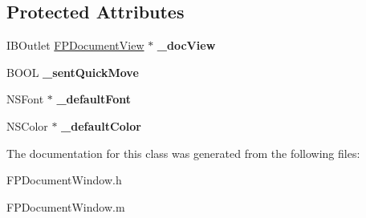 \subsection*{Protected Attributes}
\begin{DoxyCompactItemize}
\item 
\mbox{\label{interface_f_p_document_window_ab31863f6d7c3684efabd2a23bfee628a}} 
I\+B\+Outlet \mbox{\hyperlink{interface_f_p_document_view}{F\+P\+Document\+View}} $\ast$ {\bfseries \+\_\+doc\+View}
\item 
\mbox{\label{interface_f_p_document_window_af7467ded67dd8eb3555455fbf3f78553}} 
B\+O\+OL {\bfseries \+\_\+sent\+Quick\+Move}
\item 
\mbox{\label{interface_f_p_document_window_af44108ef697d5a35426dc283cc702fff}} 
N\+S\+Font $\ast$ {\bfseries \+\_\+default\+Font}
\item 
\mbox{\label{interface_f_p_document_window_a5d4da752e97a9dde5ca0b0402c38bb43}} 
N\+S\+Color $\ast$ {\bfseries \+\_\+default\+Color}
\end{DoxyCompactItemize}


The documentation for this class was generated from the following files\+:\begin{DoxyCompactItemize}
\item 
F\+P\+Document\+Window.\+h\item 
F\+P\+Document\+Window.\+m\end{DoxyCompactItemize}
